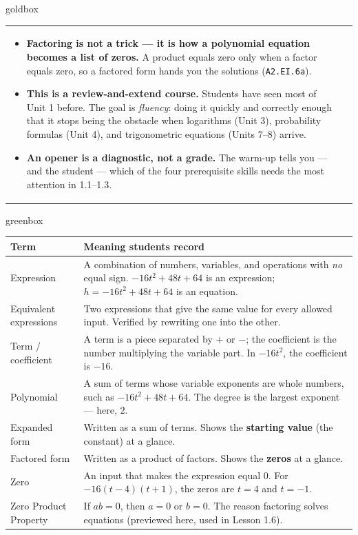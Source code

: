 \documentclass[10pt]{article}
\begin{document}
\begin{skillbox}{goldbox}
\begin{tabularx}{\linewidth}{@{}X|X@{}}
\begin{minipage}[t]{\linewidth}
\begin{itemize}[leftmargin=1.1em, itemsep=2pt, topsep=2pt]
        the question in front of you (\texttt{A2.EO.3d}).
  \item \textbf{Factoring is not a trick --- it is how a polynomial equation becomes a list of
        zeros.} A product equals zero only when a factor equals zero, so a factored form hands
        you the solutions (\texttt{A2.EI.6a}).
  \item \textbf{This is a review-and-extend course.} Students have seen most of Unit 1 before.
        The goal is \emph{fluency}: doing it quickly and correctly enough that it stops being
        the obstacle when logarithms (Unit 3), probability formulas (Unit 4), and trigonometric
        equations (Units 7--8) arrive.
  \item \textbf{An opener is a diagnostic, not a grade.} The warm-up tells you --- and the
        student --- which of the four prerequisite skills needs the most attention in 1.1--1.3.
\end{itemize}
\end{minipage}
\end{tabularx}
\end{skillbox}

\begin{skillbox}{greenbox}
\renewcommand{\arraystretch}{1.35}
\begin{tabularx}{\linewidth}{@{}p{3.6cm}X@{}}
\textbf{Term} & \textbf{Meaning students record} \\
\hline
Expression & A combination of numbers, variables, and operations with \emph{no} equal sign.
    $-16t^2+48t+64$ is an expression; $h=-16t^2+48t+64$ is an equation. \\
Equivalent expressions & Two expressions that give the same value for every allowed input.
    Verified by rewriting one into the other. \\
Term / coefficient & A term is a piece separated by $+$ or $-$; the coefficient is the number
    multiplying the variable part. In $-16t^2$, the coefficient is $-16$. \\
Polynomial & A sum of terms whose variable exponents are whole numbers, such as
    $-16t^2+48t+64$. The degree is the largest exponent --- here, $2$. \\
Expanded form & Written as a sum of terms. Shows the \textbf{starting value} (the constant) at a
    glance. \\
Factored form & Written as a product of factors. Shows the \textbf{zeros} at a glance. \\
Zero & An input that makes the expression equal $0$. For $-16(t-4)(t+1)$, the zeros are
    $t=4$ and $t=-1$. \\
Zero Product Property & If $ab=0$, then $a=0$ or $b=0$. The reason factoring solves equations
    (previewed here, used in Lesson 1.6). \\
\end{tabularx}
\end{skillbox}
\end{document}
